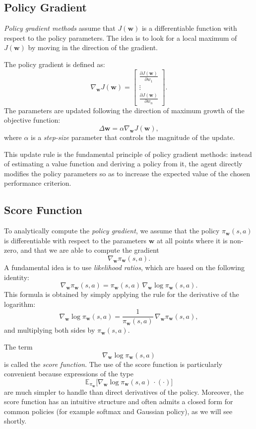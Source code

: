 \subsection{Policy Gradient}

\emph{Policy gradient methods} assume that $J(\mathbf{w})$ is a differentiable function with respect to the policy parameters. The idea is to look for a local maximum of $J(\mathbf{w})$ by moving in the direction of the gradient.

The policy gradient is defined as:
\[
\nabla_{\mathbf{w}} J(\mathbf{w}) =
\begin{bmatrix}
\frac{\partial J(\mathbf{w})}{\partial w_1} \\
\vdots \\
\frac{\partial J(\mathbf{w})}{\partial w_n}
\end{bmatrix}.
\]
The parameters are updated following the direction of maximum growth of the objective function:
\[
\Delta \mathbf{w} = \alpha \nabla_{\mathbf{w}} J(\mathbf{w}),
\]
where $\alpha$ is a \emph{step-size} parameter that controls the magnitude of the update.

This update rule is the fundamental principle of policy gradient methods: instead of estimating a value function and deriving a policy from it, the agent directly modifies the policy parameters so as to increase the expected value of the chosen performance criterion.

\subsection{Score Function}

To analytically compute the \emph{policy gradient}, we assume that the policy $\pi_{\mathbf{w}}(s,a)$ is differentiable with respect to the parameters $\mathbf{w}$ at all points where it is non-zero, and that we are able to compute the gradient
\[
\nabla_{\mathbf{w}} \pi_{\mathbf{w}}(s,a).
\]
A fundamental idea is to use \emph{likelihood ratios}, which are based on the following identity:
\[
\nabla_{\mathbf{w}} \pi_{\mathbf{w}}(s,a)
= \pi_{\mathbf{w}}(s,a)\, \nabla_{\mathbf{w}} \log \pi_{\mathbf{w}}(s,a).
\]
This formula is obtained by simply applying the rule for the derivative of the logarithm:
\[
\nabla_{\mathbf{w}} \log \pi_{\mathbf{w}}(s,a)
= \frac{1}{\pi_{\mathbf{w}}(s,a)}\, \nabla_{\mathbf{w}} \pi_{\mathbf{w}}(s,a),
\]
and multiplying both sides by $\pi_{\mathbf{w}}(s,a)$.

The term
\[
\nabla_{\mathbf{w}} \log \pi_{\mathbf{w}}(s,a)
\]
is called the \emph{score function}. The use of the score function is particularly convenient because expressions of the type
\[
\mathbb{E}_{\pi_{\mathbf{w}}}\big[\nabla_{\mathbf{w}} \log \pi_{\mathbf{w}}(s,a)\,\cdot(\cdot)\big]
\]
are much simpler to handle than direct derivatives of the policy. Moreover, the score function has an intuitive structure and often admits a closed form for common policies (for example softmax and Gaussian policy), as we will see shortly.

